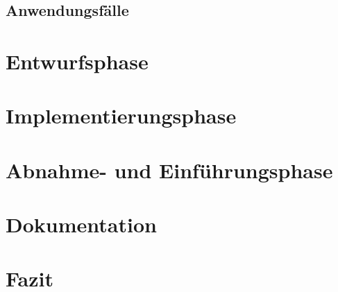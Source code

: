 \section{Anwendungsfälle}

\chapter{Entwurfsphase}

\chapter{Implementierungsphase}

\chapter{Abnahme- und Einführungsphase}

\chapter{Dokumentation}

\chapter{Fazit}
